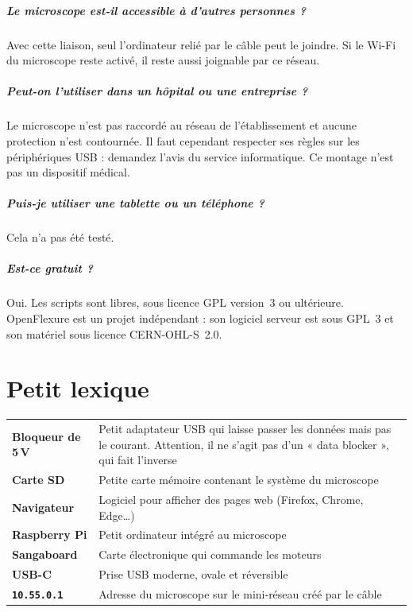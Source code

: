 \documentclass[11pt,a4paper,openany]{report}
\newcommand{\ip}[1]{\texttt{#1}}
\begin{document}
\paragraph{Le microscope est-il accessible à d'autres personnes ?}
Avec cette liaison, seul l'ordinateur relié par le câble peut le joindre. Si le Wi-Fi du microscope reste activé, il reste aussi joignable par ce réseau.

\paragraph{Peut-on l'utiliser dans un hôpital ou une entreprise ?}
Le microscope n'est pas raccordé au réseau de l'établissement et aucune protection n'est contournée. Il faut cependant respecter ses règles sur les périphériques USB : demandez l'avis du service informatique. Ce montage n'est pas un dispositif médical.

\paragraph{Puis-je utiliser une tablette ou un téléphone ?}
Cela n'a pas été testé.

\paragraph{Est-ce gratuit ?}
Oui. Les scripts sont libres, sous licence GPL version~3 ou ultérieure. OpenFlexure est un projet indépendant : son logiciel serveur est sous GPL~3 et son matériel sous licence CERN-OHL-S~2.0.

\chapter{Petit lexique}

\begin{table}[H]
\centering
\small
\begin{tabularx}{\textwidth}{@{}>{\bfseries}p{3.8cm}L@{}}
\toprule
Bloqueur de 5\,V & Petit adaptateur USB qui laisse passer les données mais pas le courant. Attention, il ne s'agit pas d'un « data blocker », qui fait l'inverse \\
Carte SD & Petite carte mémoire contenant le système du microscope \\
Navigateur & Logiciel pour afficher des pages web (Firefox, Chrome, Edge\dots) \\
Raspberry Pi & Petit ordinateur intégré au microscope \\
Sangaboard & Carte électronique qui commande les moteurs \\
USB-C & Prise USB moderne, ovale et réversible \\
\ip{10.55.0.1} & Adresse du microscope sur le mini-réseau créé par le câble \\
\bottomrule
\end{tabularx}
\end{table}
\end{document}
